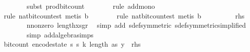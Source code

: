 \begin{isabellebody}
\ \ \ \ \ \ \isamarkupfalse%
\ {\isacharparenleft}{\kern0pt}subst\ prod{\isacharunderscore}{\kern0pt}bit{\isacharunderscore}{\kern0pt}count{\isacharunderscore}{\kern0pt}{}{\isacharparenright}{\kern0pt}\isanewline
\ \ \ \ \ \ \isamarkupfalse%
\ {\isacharparenleft}{\kern0pt}rule\ add{\isacharunderscore}{\kern0pt}mono{\isacharparenright}{\kern0pt}\isanewline
\ \ \ \ \ \ \isamarkupfalse%
\ {\isacharparenleft}{\kern0pt}rule\ nat{\isacharunderscore}{\kern0pt}bit{\isacharunderscore}{\kern0pt}count{\isacharunderscore}{\kern0pt}est{\isacharcomma}{\kern0pt}\ metis\ b{}{\isacharparenright}{\kern0pt}\isanewline
\ \ \ \ \ \ \isamarkupfalse%
\ {\isacharparenleft}{\kern0pt}rule\ nat{\isacharunderscore}{\kern0pt}bit{\isacharunderscore}{\kern0pt}count{\isacharunderscore}{\kern0pt}est{\isacharcomma}{\kern0pt}\ metis\ b{}{\isacharparenright}{\kern0pt}\isanewline
\ \ \ \ \isamarkupfalse%
\ \isamarkupfalse%
\ {\isachardoublequoteopen}{\isachardot}{\kern0pt}{\isachardot}{\kern0pt}{\isachardot}{\kern0pt}\ {\isasymle}\ {\isacharquery}{\kern0pt}rhs{\isachardoublequoteclose}\isanewline
\ \ \ \ \ \ \isamarkupfalse%
\ n{\isacharunderscore}{\kern0pt}nonzero\ length{\isacharunderscore}{\kern0pt}xs{\isacharunderscore}{\kern0pt}gr{\isacharunderscore}{\kern0pt}{}\ \isamarkupfalse%
\ {\isacharparenleft}{\kern0pt}simp\ add{\isacharcolon}{\kern0pt}\ sdef{\isacharbrackleft}{\kern0pt}symmetric{\isacharbrackright}{\kern0pt}\ sdef{\isacharbrackleft}{\kern0pt}symmetric{\isacharcomma}{\kern0pt}simplified{\isacharbrackright}{\kern0pt}{\isacharparenright}{\kern0pt}\isanewline
\ \ \ \ \ \ \isamarkupfalse%
\ {\isacharparenleft}{\kern0pt}simp\ add{\isacharcolon}{\kern0pt}algebra{\isacharunderscore}{\kern0pt}simps{\isacharparenright}{\kern0pt}\isanewline
\ \ \ \ \isamarkupfalse%
\ \isamarkupfalse%
\ {\isachardoublequoteopen}bit{\isacharunderscore}{\kern0pt}count\ {\isacharparenleft}{\kern0pt}encode{\isacharunderscore}{\kern0pt}state\ {\isacharparenleft}{\kern0pt}s\ s\ k{\isacharcomma}{\kern0pt}\ length\ as{\isacharcomma}{\kern0pt}\ y{\isacharparenright}{\kern0pt}{\isacharparenright}{\kern0pt}\ {\isasymle}\ {\isacharquery}{\kern0pt}rhs{\isachardoublequoteclose}\isanewline

\end{isabellebody}
